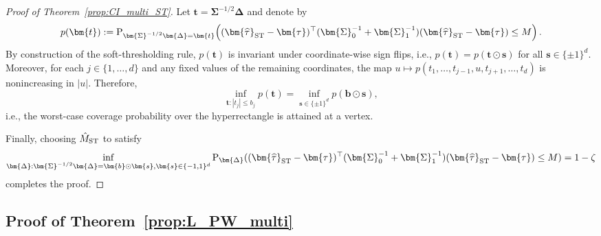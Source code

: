 \documentclass[11pt]{article}
\def\P{{\mathrm P}}
\newcommand{\htau}{\widehat\tau}
\numberwithin{equation}{section}
\theoremstyle{definition}
\begin{document}
\begin{proof}[Proof of Theorem~\ref{prop:CI_multi_ST}]
Let $\bm{t}=\bm{\Sigma}^{-1/2}\bm{\Delta}$ and denote by
\[
p(\bm{t})
:=\P_{\bm{\Sigma}^{-1/2}\bm{\Delta}=\bm{t}}\!\left(
(\bm{\htau}_{\rm ST}-\bm{\tau})^\top(\bm{\Sigma}_0^{-1}+\bm{\Sigma}_1^{-1})
(\bm{\htau}_{\rm ST}-\bm{\tau})\le M
\right).
\]
By construction of the soft-thresholding rule,
$p(\bm{t})$ is invariant under coordinate-wise sign flips, i.e.,
$p(\bm{t})=p(\bm{t}\odot\bm{s})$ for all $\bm{s}\in\{\pm1\}^d$.
Moreover, for each $j\in\{1,\ldots,d\}$ and any fixed values of the remaining coordinates,
the map $u\mapsto p(t_1,\ldots,t_{j-1},u,t_{j+1},\ldots,t_d)$ is nonincreasing in $\lvert u \rvert$.
Therefore,
\[
\inf_{\bm{t}:|t_j|\le b_j} p(\bm{t})
=\inf_{\bm{s}\in\{\pm1\}^d} p(\bm{b}\odot\bm{s}),
\]
i.e., the worst-case coverage probability over the hyperrectangle is attained at a vertex.

Finally, choosing $\hat M_{\rm ST}$ to satisfy
\[
  \inf_{\bm{\Delta}: \bm{\Sigma}^{-1/2} \bm{\Delta} = \bm{b} \odot \bm{s}, \bm{s} \in \{-1,1\}^d} \P_{\bm{\Delta}}((\bm{\htau}_{\rm ST} - \bm{\tau})^\top (\bm{\Sigma}_0^{-1} + \bm{\Sigma}_1^{-1}) (\bm{\htau}_{\rm ST} - \bm{\tau}) \le M) = 1-\zeta
\]
completes the proof.

\end{proof}


\subsection{Proof of Theorem~\ref{prop:L_PW_multi}}
\end{document}
